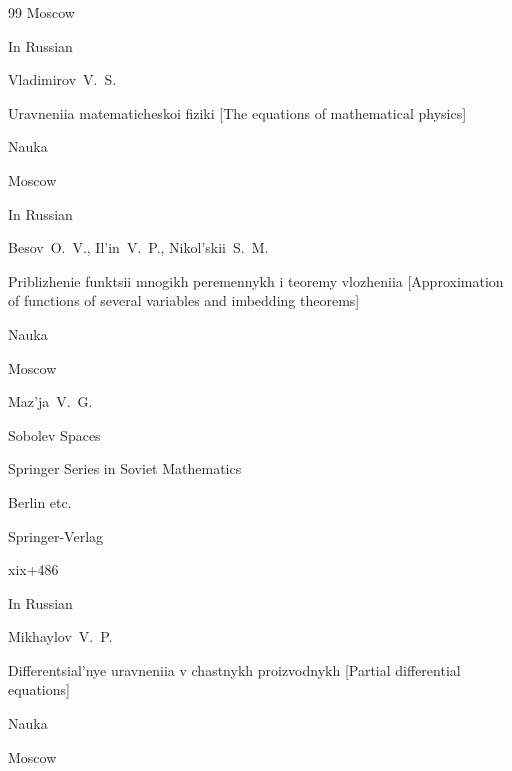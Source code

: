 \begin{thebibliography}{99}
\publaddr Moscow




\lang In Russian

\by Vladimirov~V.~S.

\book Uravneniia matematicheskoi fiziki \rm [The equations of mathematical physics]

\publ Nauka

\publaddr Moscow





\lang In Russian

\by Besov~O.~V., Il'in~V.~P., Nikol'skii~S.~M.

\book Priblizhenie funktsii mnogikh peremennykh i teoremy vlozheniia \rm  [Approximation of functions of several variables and imbedding theorems]


\publ Nauka

\publaddr Moscow






\by Maz'ja~V.~G.


\book Sobolev Spaces

\serial Springer Series in Soviet Mathematics

\publaddr Berlin etc.

\publ Springer-Verlag

\totalpages xix+486









\lang In Russian

\by Mikhaylov~V.~P.

\book Differentsial'nye uravneniia v chastnykh proizvodnykh \rm [Partial differential equations]


\publ Nauka

\publaddr Moscow






\end{thebibliography}
